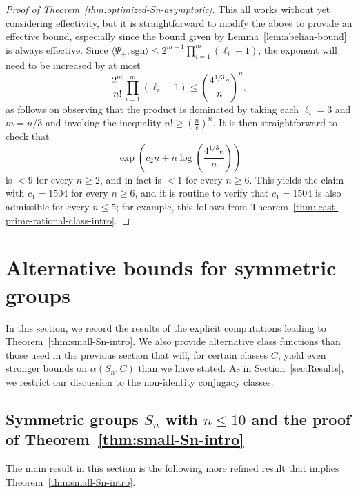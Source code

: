 \documentclass[12pt]{amsart}
\theoremstyle{definition} \newtheorem{definition}[theorem]{Definition}
\theoremstyle{example} \newtheorem{example}[theorem]{Example}
\theoremstyle{remark} \newtheorem{remark}{Remark}[theorem]
\numberwithin{equation}{section}
\numberwithin{theorem}{section}
\renewcommand{\leq}{\leqslant}
\renewcommand{\geq}{\geqslant}
\begin{document}
\begin{proof}[Proof of Theorem~\ref{thm:optimized-Sn-asymptotic}]
		This all works without yet considering effectivity, but it is straightforward to modify the above to provide an effective bound, especially since the bound given by Lemma~\ref{lem:abelian-bound} is always effective.  Since $\langle \Psi_+, \mathrm{sgn} \rangle \leq 2^{m-1} \prod_{i=1}^m (\ell_i -1)$, the exponent will need to be increased by at most
			\[
				\frac{2^m}{n!} \prod_{i=1}^m (\ell_i - 1)
					\leq \left(\frac{4^{1/3} e}{n}\right)^n,
			\]
		as follows on observing that the product is dominated by taking each $\ell_i = 3$ and $m = n/3$ and invoking the inequality $n! \geq \left(\frac{n}{e}\right)^n$.  It is then straightforward to check that
			\[
				\exp\left(c_2n + n\log\left(\frac{4^{1/3}e}{n}\right)\right)
			\]
		is $< 9$ for every $n \geq 2$, and in fact is $< 1$ for every $n \geq 6$.  This yields the claim with $c_1 = 1504$ for every $n \geq 6$, and it is routine to verify that $c_1 = 1504$ is also admissible for every $n \leq 5$; for example, this follows from Theorem~\ref{thm:least-prime-rational-class-intro}.
	\end{proof}

	

\section{Alternative bounds for symmetric groups}	
	\label{sec:small-symmetric}

	In this section, we record the results of the explicit computations leading to Theorem~\ref{thm:small-Sn-intro}.  We also provide alternative class functions than those used in the previous section that will, for certain classes $C$, yield even stronger bounds on $\alpha(S_n,C)$ than we have stated.  As in Section~\ref{sec:Results}, we restrict our discussion to the non-identity conjugacy classes.
	
\subsection{Symmetric groups $S_n$ with $n \leq 10$ and the proof of Theorem~\ref{thm:small-Sn-intro}}

	The main result in this section is the following more refined result that implies Theorem~\ref{thm:small-Sn-intro}.
	
\end{document}
